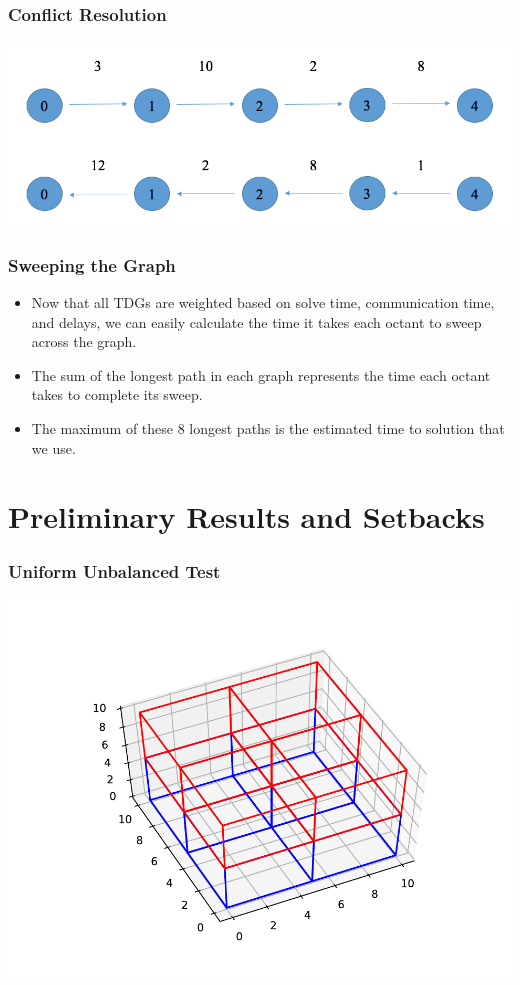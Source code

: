 \documentclass[xcolor={usenames,dvipsnames,svgnames,table}]{beamer}
\begin{document}
\begin{frame}[t]\frametitle{Conflict Resolution}
	\includegraphics[scale=0.35]{figures/postconflict.png}

\end{frame}

\begin{frame}[t]\frametitle{Sweeping the Graph}
\begin{block}{}
\begin{itemize}
	\item Now that all TDGs are weighted based on solve time, communication time, and delays, we can easily calculate the time it takes each octant to sweep across the graph. 
	\item The sum of the longest path in each graph represents the time each octant takes to complete its sweep.
	\item The maximum of these 8 longest paths is the estimated time to solution that we use.
\end{itemize}
\end{block}
\end{frame}

\section{Preliminary Results and Setbacks}

\begin{frame}[t]\frametitle{Uniform Unbalanced Test}
\centering
	\includegraphics[trim={1cm 1cm 1cm 1cm},clip,scale=0.75]{figures/uniform_unbalanced_partitioning.pdf}
\end{frame}
\end{document}
